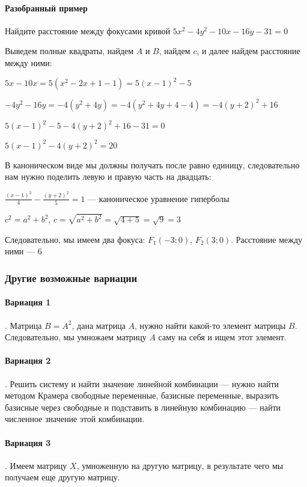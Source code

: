 \documentclass{article}
\begin{document}
\begin{flushleft}
\paragraph{Разобранный пример}

Найдите расстояние между фокусами кривой $5x^2 - 4y^2 - 10x - 16y - 31 = 0$

Выведем полные квадраты, найдем $A$ и $B$, найдем $c$, и далее найдем расстояние между ними:

\bigskip

$5x - 10x = 5(x^2 - 2x + 1 - 1) = 5(x-1)^2 - 5$

$-4y^2 - 16y = -4(y^2 + 4y) = -4(y^2 + 4y + 4 - 4) = -4(y + 2)^2 + 16$

$5 (x - 1)^2 - 5 - 4(y + 2)^2 + 16 - 31 = 0$

$5 (x - 1)^2 - 4(y + 2)^2 = 20$

В каноническом виде мы должны получать после равно единицу, следовательно нам нужно поделить левую и правую часть на двадцать:

$\frac{(x - 1)^2}{4} - \frac{(y+2)^2}{5} = 1$ — каноническое уравнение гиперболы

$c^2 = a^2 + b^2$, $c = \sqrt{a^2 + b^2} = \sqrt{4 + 5} = \sqrt{9} = 3$

\bigskip

Следовательно, мы имеем два фокуса: $F_1(-3; 0)$, $F_2(3; 0)$. Расстояние между ними — 6


\subsubsection{Другие возможные вариации}

\paragraph{Вариация 1}. Матрица $B = A^2$, дана матрица $A$, нужно найти какой-то элемент матрицы $B$. Следовательно, мы умножаем матрицу $A$ саму на себя и ищем этот элемент.

\paragraph{Вариация 2}. Решить систему и найти значение линейной комбинации — нужно найти методом Крамера свободные переменные, базисные переменные, выразить базисные через свободные и подставить в линейную комбинацию — найти численное значение этой комбинации.

\paragraph{Вариация 3}. Имеем матрицу $X$, умноженную на другую матрицу, в результате чего мы получаем еще другую матрицу.


\end{flushleft}
\end{document}
